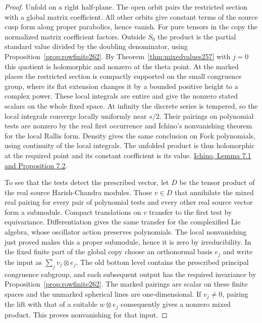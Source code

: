 \documentclass[a4paper,11pt]{article}
\theoremstyle{definition}
\theoremstyle{remark}
\numberwithin{equation}{section}
\begin{document}
\begin{proof}
Unfold on a right half-plane. The open orbit pairs the
restricted section with a global matrix coefficient. All other
orbits give constant terms of the source cusp form along
proper parabolics, hence vanish. For pure tensors in the copy
the normalized matrix coefficient factors. Outside \(S_0\) the
product is the partial standard value divided by the doubling
denominator, using Proposition~\ref{prop:rowfinite262}. By
Theorem~\ref{thm:mixedvalues257} with \(j=0\) this quotient
is holomorphic and nonzero at the theta point. At the marked
places the restricted section is compactly supported on the
small congruence group, where its flat extension changes it
by a bounded positive height to a complex power. These local
integrals are entire and give the nonzero stated scalars on
the whole fixed space. At infinity the discrete series is
tempered, so the local integrals converge locally uniformly
near \(s/2\). Their pairings on polynomial tests are nonzero
by the real first occurrence and Ichino's nonvanishing theorem
for the local Rallis form. Density gives the same conclusion
on Fock polynomials, using continuity of the local integrals.
The unfolded product is thus holomorphic at the required point
and its constant coefficient is its value.
\href{https://arxiv.org/pdf/2002.09148}{Ichino, Lemma 7.1 and
Proposition 7.2}.

To see that the tests detect the prescribed vector, let \(D\)
be the tensor product of the real source Harish-Chandra modules.
Those \(v\in D\) that annihilate the mixed real pairing for
every pair of polynomial tests and every other real source
vector form a submodule. Compact translations on \(v\) transfer
to the first test by equivariance. Differentiation gives the
same transfer for the complexified Lie algebra, whose oscillator
action preserves polynomials. The local nonvanishing just proved
makes this a proper submodule, hence it is zero by irreducibility.
In the fixed finite part of the global copy choose an orthonormal
basis \(e_j\) and write the input as \(\sum_jv_j\otimes e_j\).
The old bottom level contains the prescribed principal congruence
subgroup, and each subsequent output has the required invariance
by Proposition~\ref{prop:rowfinite262}. The marked pairings are
scalar on these finite spaces and the unmarked spherical lines
are one-dimensional. If \(v_j\ne0\), pairing the lift with that
of a suitable \(w\otimes e_j\) consequently gives a nonzero
mixed product. This proves nonvanishing for that input.


\end{proof}
\end{document}

